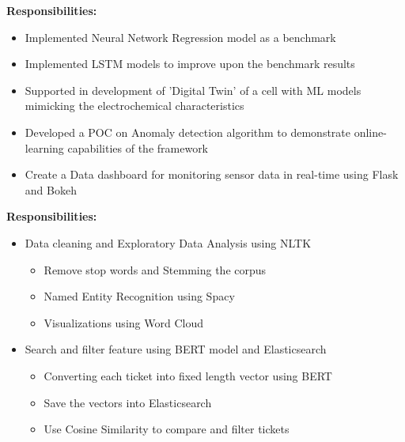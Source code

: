 \documentclass[10pt,a4paper,ragged2e,withhyper]{altacv}
\begin{document}
            \smallskip
            \textbf{Responsibilities:}\\
            \vspace{0.5em}
            \begin{itemize}
                \item Implemented Neural Network Regression model as a benchmark
                \item Implemented LSTM models to improve upon the benchmark results
                \item Supported in development of 'Digital Twin' of a cell with ML models mimicking the electrochemical characteristics
                \item Developed a POC on Anomaly detection algorithm to demonstrate online-learning capabilities of the framework
                \item Create a Data dashboard for monitoring sensor data in real-time using Flask and Bokeh
            \end{itemize}
            \divider

            \smallskip
            \textbf{Responsibilities:}\\
            \vspace{0.5em}
            \begin{itemize}
                \item Data cleaning and Exploratory Data Analysis using NLTK
                    \begin{itemize}
                        \item Remove stop words and Stemming the corpus
                        \item Named Entity Recognition using Spacy
                        \item Visualizations using Word Cloud
                    \end{itemize}
                \item Search and filter feature using BERT model and Elasticsearch
                \begin{itemize}
                    \item Converting each ticket into fixed length vector using BERT
                    \item Save the vectors into Elasticsearch
                    \item Use Cosine Similarity to compare and filter tickets
                \end{itemize}
            \end{itemize}
            \divider
\end{document}
